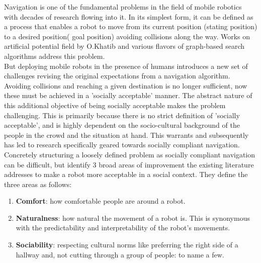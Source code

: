 

Navigation is one of the fundamental problems in the field of mobile robotics with decades of research flowing into it. In its simplest form, it can be defined as a process that enables a robot to move from its current position (stating position) to a desired position( goal position) avoiding collisions along the way. Works on artificial potential field by O.Khatib \cite{khatib_1986} and various flavors of graph-based search algorithms address this problem.\\

But deploying mobile robots in the presence of humans introduces a new set of challenges revising the original expectations from a navigation algorithm. Avoiding collisions and reaching a given destination is no longer sufficient, now these must be achieved in a 'socially acceptable' manner. The abstract nature of this additional objective of being socially acceptable makes the problem challenging. This is primarily because there is no strict definition of 'socially acceptable', and is highly dependent on the socio-cultural background of the people in the crowd and the situation at hand. This warrants and subsequently has led to research specifically geared towards socially compliant navigation.\\

Concretely structuring a loosely defined problem as socially compliant navigation can be difficult, but \cite{kruse_human-aware_2013} identify 3 broad areas of improvement the existing literature addresses to make a robot more acceptable in a social context. They define the three areas as follows:

\begin{enumerate}
    \item \textbf{Comfort}: how comfortable people are around a robot. 
    \item \textbf{Naturalness}: how natural the movement of a robot is. This is synonymous with the predictability and interpretability of the robot's movements.
    \item \textbf{Sociability}: respecting cultural norms like preferring the right side of a hallway and, not cutting through a group of people: to name a few. %
\end{enumerate}

